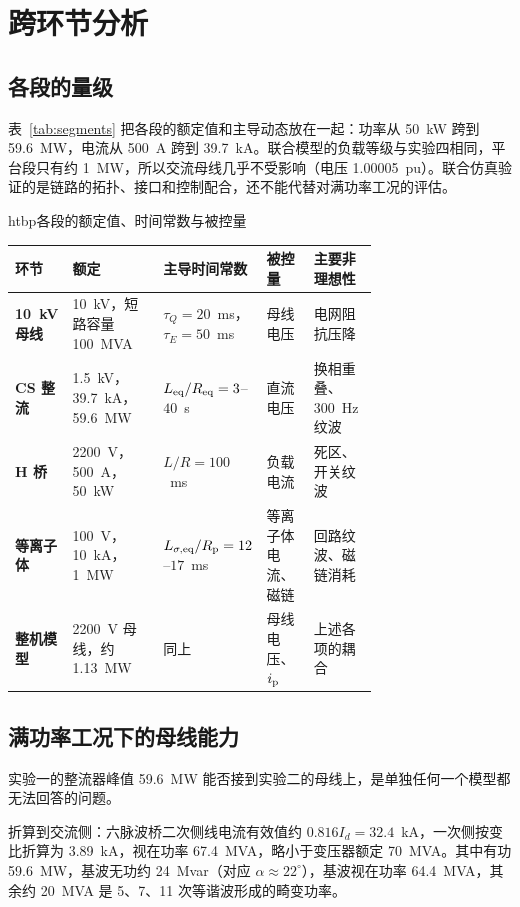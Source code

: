 
\chapter{跨环节分析}
\label{chap:analysis}

\section{各段的量级}

表~\ref{tab:segments} 把各段的额定值和主导动态放在一起：功率从 50~kW 跨到 59.6~MW，电流从 500~A 跨到 39.7~kA。联合模型的负载等级与实验四相同，平台段只有约 1~MW，所以交流母线几乎不受影响（电压 1.00005~pu）。联合仿真验证的是链路的拓扑、接口和控制配合，还不能代替对满功率工况的评估。

\begin{dtable}{htbp}{各段的额定值、时间常数与被控量}
\label{tab:segments}
\begin{tabularx}{\linewidth}{P{0.15\linewidth}P{0.25\linewidth}P{0.19\linewidth}P{0.13\linewidth}L}
\toprule
\headrow 环节 & 额定 & 主导时间常数 & 被控量 & 主要非理想性 \\
\midrule
\textcolor{segbus}{\textbf{10~kV 母线}} & 10~kV，短路容量 100~MVA & $\tau_Q=20$~ms，$\tau_E=50$~ms & 母线电压 & 电网阻抗压降 \\
\textcolor{segrect}{\textbf{CS 整流}} & 1.5~kV，39.7~kA，59.6~MW & $L_{\mathrm{eq}}/R_{\mathrm{eq}}=3$--$40$~s & 直流电压 & 换相重叠、300~Hz 纹波 \\
\textcolor{seghb}{\textbf{H 桥}} & 2200~V，500~A，50~kW & $L/R=100$~ms & 负载电流 & 死区、开关纹波 \\
\textcolor{segpl}{\textbf{等离子体}} & 100~V，10~kA，1~MW & $L_{\sigma,\mathrm{eq}}/R_{\mathrm{p}}=12$--$17$~ms & 等离子体电流、磁链 & 回路纹波、磁链消耗 \\
\textbf{整机模型} & 2200~V 母线，约 1.13~MW & 同上 & 母线电压、$i_{\mathrm{p}}$ & 上述各项的耦合 \\
\bottomrule
\end{tabularx}
\end{dtable}

\section{满功率工况下的母线能力}

实验一的整流器峰值 59.6~MW 能否接到实验二的母线上，是单独任何一个模型都无法回答的问题。

折算到交流侧：六脉波桥二次侧线电流有效值约 $0.816I_d=32.4$~kA，一次侧按变比折算为 3.89~kA，视在功率 67.4~MVA，略小于变压器额定 70~MVA。其中有功 59.6~MW，基波无功约 24~Mvar（对应 $\alpha\approx22^\circ$），基波视在功率 64.4~MVA，其余约 20~MVA 是 5、7、11 次等谐波形成的畸变功率。


